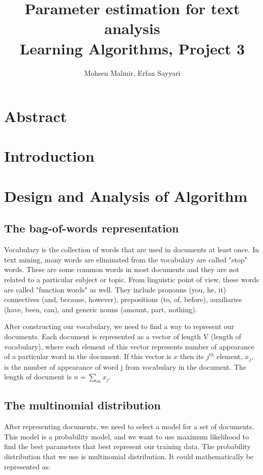 \documentclass[twoside,12pt]{article}
\begin{document}
\title{Parameter estimation for text analysis\\  Learning Algorithms, Project 3}
\author{Mohsen Malmir, Erfan Sayyari}
\maketitle
\section{Abstract}


\section{Introduction}



\section{Design and Analysis of Algorithm}

\subsection{The bag-of-words representation}
Vocabulary is the collection of words that are used in documents at least once. In text mining, many words are eliminated from the vocabulary are called "stop" words. These are some common words in most documents and they are not related to a particular subject or topic. From linguistic point of view, these words are called "function words" as well. They include pronouns (you, he, it) connectives (and, because, however), prepositions (to, of, before), auxiliaries (have, been, can), and generic nouns (amount, part, nothing). 

After constructing our vocabulary, we need to find a way to represent our documents. Each document is represented as a vector of length V (length of vocabulary), where each element of this vector represents number of appearance of a particular word in the document. If this vector is $x$ then its $j^{th}$ element, $x_j$, is the number of appearance of word j from vocabulary in the document. The length of document is $n=\sum_{m}x_j.$
\subsection{The multinomial distribution}
After representing documents, we need to select a model for a set of documents. This model is a probability model, and we want to use maximum likelihood to find the best parameters that best represent our training data. The probability distribution that we use is multinomial distribution. It could mathematically be represented as:
\end{document}
